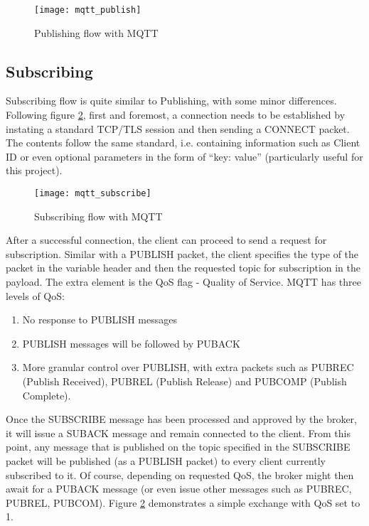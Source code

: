 \begin{figure}[ht]
    \centering
    \texttt{[image: mqtt\_publish]}
    \caption{Publishing flow with MQTT}
    \label{fig:mqtt_publish}
\end{figure}


\subsection{Subscribing}\label{sec:sub}

Subscribing flow is quite similar to Publishing, with some minor differences. Following figure \ref{fig:mqtt_subscribe}, first and foremost, a connection needs to be established by instating a standard TCP/TLS session and then sending a CONNECT packet. The contents follow the same standard, i.e. containing information such as Client ID or even optional parameters in the form of ``key: value'' (particularly useful for this project).

\begin{figure}[ht]
    \centering
    \texttt{[image: mqtt\_subscribe]}
    \caption{Subscribing flow with MQTT}
    \label{fig:mqtt_subscribe}
\end{figure}

After a successful connection, the client can proceed to send a request for subscription. Similar with a PUBLISH packet, the client specifies the type of the packet in the variable header and then the requested topic for subscription in the payload. The extra element is the QoS flag - Quality of Service. MQTT has three levels of QoS:
\begin{enumerate}\addtocounter{enumi}{-1}
  \item No response to PUBLISH messages
  \item PUBLISH messages will be followed by PUBACK
  \item More granular control over PUBLISH, with extra packets such as PUBREC (Publish Received), PUBREL (Publish Release) and PUBCOMP (Publish Complete).
\end{enumerate}

Once the SUBSCRIBE message has been processed and approved by the broker, it will issue a SUBACK message and remain connected to the client. From this point, any message that is published on the topic specified in the SUBSCRIBE packet will be published (as a PUBLISH packet) to every client currently subscribed to it. Of course, depending on requested QoS, the broker might then await for a PUBACK message (or even issue other messages such as PUBREC, PUBREL, PUBCOM). Figure \ref{fig:mqtt_subscribe} demonstrates a simple exchange with QoS set to 1. 


